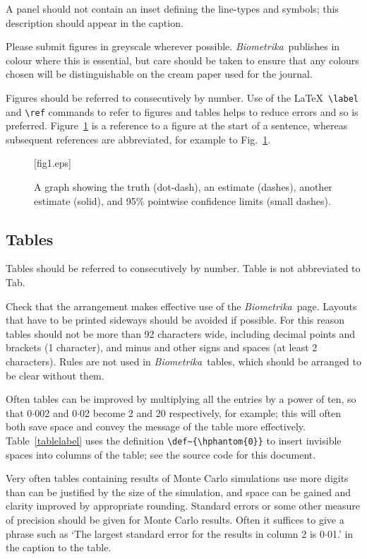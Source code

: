 \documentclass[article,lineno]{biometrika}
\def\Bka{{\it Biometrika}}
\begin{document}
A panel should not contain an inset defining the line-types and symbols; this description should appear in the caption.

Please submit figures in greyscale wherever possible.  \Bka\ publishes in colour where this is essential, but care should be taken to ensure that any colours chosen will be distinguishable on the cream paper used for the journal.

Figures should be referred to consecutively by number. Use of the \LaTeX\ \verb+\label+ and \verb+\ref+ commands to refer to figures and tables helps to reduce errors and so is preferred.  Figure~\ref{fig1}  is a reference to a figure at the start of a sentence, whereas subsequent references are abbreviated, for example to Fig.~\ref{fig1}.

\begin{figure}
\figurebox{20pc}{25pc}{}[fig1.eps]
\caption{A graph showing the truth (dot-dash), an estimate (dashes), another estimate (solid), and 95\% pointwise confidence limits (small dashes).}
\label{fig1}
\end{figure}

\subsection{Tables}

Tables should be referred to consecutively by number. Table is not abbreviated to Tab.

Check that the arrangement makes effective use
of the \Bka\ page. Layouts that have to be printed sideways should be avoided
if possible. For this reason tables should not be more than 92 characters wide, including
decimal points and brackets (1 character), and minus and other signs and spaces (at least 2
characters).  Rules are not used in \Bka\ tables, which should be arranged to be clear without them.

Often tables can be improved by multiplying all the entries by a power of ten, so that 0$\cdot$002 and
0$\cdot$02 become 2 and 20 respectively, for example; this will often both save space and convey the message of the table more effectively. Table~\ref{tablelabel} uses the definition \verb+\def~{\hphantom{0}}+ to insert invisible spaces into columns of the table; see the source code for this document.

Very often tables containing results of Monte Carlo simulations use more digits than can be justified by the size of the simulation, and space can be gained and clarity improved by appropriate rounding.
Standard errors or some other measure of precision should be given for Monte Carlo results.
Often it suffices to give a phrase such as `The largest standard error for the results in column 2 is 0$\cdot$01.' in the caption to the table.
\end{document}

